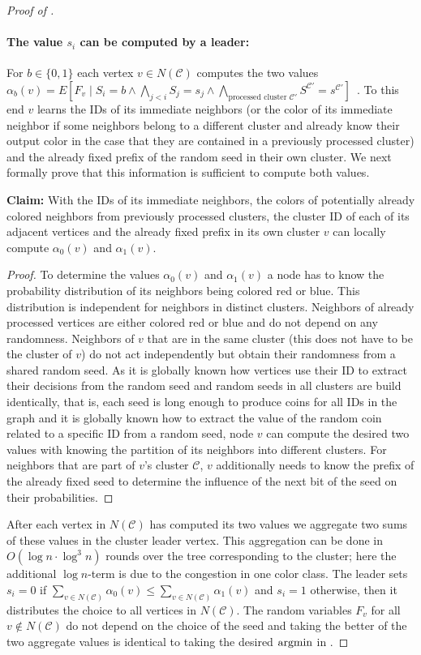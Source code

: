 \begin{proof}[Proof of ]
\paragraph{The value $s_i$ can be computed by a leader: }For $b\in \{0,1\}$ each vertex $v\in N(\mathcal{C})$ computes the two values 
$\alpha_b(v)=E[ F_v \mid S_i=b \wedge  \bigwedge_{j<i} S_j=s_j \wedge \bigwedge_{\text{processed cluster }\mathcal{C}'}S^{\mathcal{C}'}=s^{\mathcal{C}'} ]$~. To this end $v$ learns the IDs of its immediate neighbors (or the color of its immediate neighbor if some neighbors belong to a different cluster and 
already know their output color in the case that they are contained in a previously processed cluster) and the already fixed prefix of the random seed in their own cluster. 
We next formally prove that this information is sufficient to compute both values.

\medskip
\noindent\textbf{Claim:} With the IDs of its immediate neighbors, the colors of potentially already colored neighbors from previously processed clusters, the cluster ID of each of its adjacent vertices and the already fixed prefix in its own cluster $v$ can locally compute $\alpha_0(v)$ and $\alpha_1(v)$. 
\begin{proof}To determine the values $\alpha_0(v)$ and $\alpha_1(v)$ a node has to know the probability distribution of its neighbors being colored red or blue. This distribution is independent for neighbors in distinct clusters. Neighbors of already processed vertices are either colored red or blue and do not depend on any randomness. Neighbors of $v$ that are in the same cluster (this does not have to be the cluster of $v$) do not act independently but obtain their randomness from a shared random seed. As it is globally known how vertices use their ID to extract their decisions from the random seed and random seeds in all clusters are build identically, that is, each seed is long enough to produce coins for all IDs in the graph and it is globally known how to extract the value of the random coin related to a specific ID from a random seed, node $v$ can compute the desired two values with knowing the partition of its neighbors into different clusters.  For neighbors that are part of $v$'s cluster $\mathcal{C}$, $v$ additionally needs to know the prefix of the already fixed seed to determine the influence of the next bit of the seed on their probabilities.  
\end{proof}
After each vertex in $N(\mathcal{C})$ has computed its two values we aggregate two sums of these values in the cluster leader vertex. 
This aggregation can be done in $O(\log n\cdot \log^3 n)$ rounds over the tree corresponding to the cluster; here the additional $\log n$-term is due to the congestion in one color class. 
 The leader sets $s_i=0$ if $\sum_{v\in N(\mathcal{C})}\alpha_0(v)\leq \sum_{v\in N(\mathcal{C})}\alpha_1(v)$ and $s_i=1$ otherwise, then it distributes the choice to all vertices in $N(\mathcal{C})$. The random variables $F_v$ for all $v\notin N(\mathcal{C})$ do not depend on the choice of the seed and taking the better of the two aggregate values is identical to taking the desired $\operatorname{argmin}$ in . 



\end{proof}
